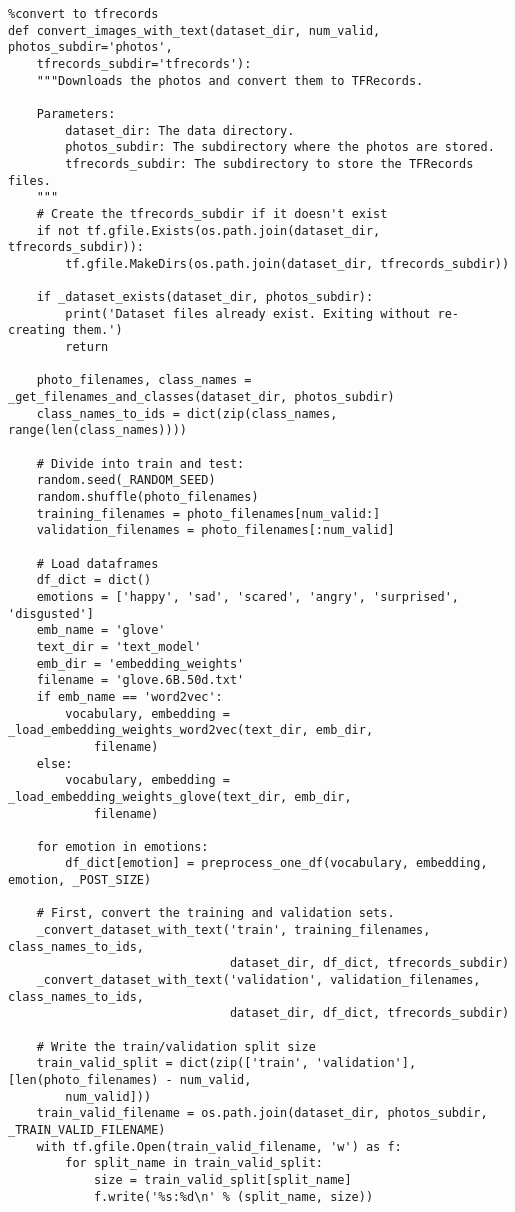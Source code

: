 \begin{lstlisting}
%convert to tfrecords
def convert_images_with_text(dataset_dir, num_valid, photos_subdir='photos', 
    tfrecords_subdir='tfrecords'):
    """Downloads the photos and convert them to TFRecords.

    Parameters:
        dataset_dir: The data directory.
        photos_subdir: The subdirectory where the photos are stored.
        tfrecords_subdir: The subdirectory to store the TFRecords files.
    """
    # Create the tfrecords_subdir if it doesn't exist
    if not tf.gfile.Exists(os.path.join(dataset_dir, tfrecords_subdir)):
        tf.gfile.MakeDirs(os.path.join(dataset_dir, tfrecords_subdir))

    if _dataset_exists(dataset_dir, photos_subdir):
        print('Dataset files already exist. Exiting without re-creating them.')
        return

    photo_filenames, class_names = _get_filenames_and_classes(dataset_dir, photos_subdir)
    class_names_to_ids = dict(zip(class_names, range(len(class_names))))

    # Divide into train and test:
    random.seed(_RANDOM_SEED)
    random.shuffle(photo_filenames)
    training_filenames = photo_filenames[num_valid:]
    validation_filenames = photo_filenames[:num_valid]

    # Load dataframes
    df_dict = dict()
    emotions = ['happy', 'sad', 'scared', 'angry', 'surprised', 'disgusted']
    emb_name = 'glove'
    text_dir = 'text_model'
    emb_dir = 'embedding_weights'
    filename = 'glove.6B.50d.txt'
    if emb_name == 'word2vec':
        vocabulary, embedding = _load_embedding_weights_word2vec(text_dir, emb_dir, 
            filename)
    else:
        vocabulary, embedding = _load_embedding_weights_glove(text_dir, emb_dir, 
            filename)

    for emotion in emotions:
        df_dict[emotion] = preprocess_one_df(vocabulary, embedding, emotion, _POST_SIZE)

    # First, convert the training and validation sets.
    _convert_dataset_with_text('train', training_filenames, class_names_to_ids,
                               dataset_dir, df_dict, tfrecords_subdir)
    _convert_dataset_with_text('validation', validation_filenames, class_names_to_ids,
                               dataset_dir, df_dict, tfrecords_subdir)

    # Write the train/validation split size
    train_valid_split = dict(zip(['train', 'validation'], [len(photo_filenames) - num_valid, 
        num_valid]))
    train_valid_filename = os.path.join(dataset_dir, photos_subdir, _TRAIN_VALID_FILENAME)
    with tf.gfile.Open(train_valid_filename, 'w') as f:
        for split_name in train_valid_split:
            size = train_valid_split[split_name]
            f.write('%s:%d\n' % (split_name, size))


\end{lstlisting}
